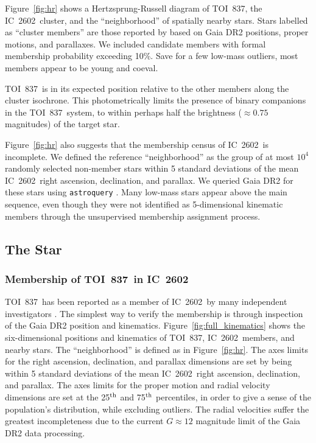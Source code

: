 \documentclass[12pt,twocolumn,tighten]{aastex63}
\newcommand{\tn}{TOI~837} %
\newcommand{\cn}{IC~2602} %
\begin{document}
Figure~\ref{fig:hr} shows a Hertzsprung-Russell diagram of \tn, the
\cn\ cluster, and the ``neighborhood'' of spatially nearby stars.
Stars labelled as ``cluster members'' are those reported by
\citet{cantatgaudin_gaia_2018} based on Gaia DR2 positions, proper
motions, and parallaxes.  We included candidate members with formal
membership probability exceeding 10\%.  Save for a few low-mass
outliers, most members appear to be young and coeval.

\tn\ is in its expected position relative to the other members along
the cluster isochrone.  This photometrically limits the presence of
binary companions in the \tn\ system, to within perhaps half the
brightness ($\approx0.75$ magnitudes) of the target star.

Figure~\ref{fig:hr} also suggests that the membership census of \cn\
is incomplete.  We defined the reference ``neighborhood'' as the group
of at most $10^4$ randomly selected non-member stars within 5 standard
deviations of the mean \cn\ right ascension, declination, and
parallax.  We queried Gaia DR2 for these stars using
\texttt{astroquery} \citep{astroquery_2018}.  Many low-mass stars
appear above the main sequence, even though they were not identified
as 5-dimensional kinematic members through the unsupervised
\citet{cantatgaudin_gaia_2018} membership assignment process.


\subsection{The Star}
\label{subsec:star}

\subsubsection{Membership of \tn\ in \cn}
\label{subsec:member}

\tn\ has been reported as a member of \cn\ by many independent
investigators \citep[{\it
e.g.},][]{Kharchenko_et_al_2013,oh_comoving_2017,cantatgaudin_gaia_2018,damiani_stellar_2019,kounkel_untangling_2019}.
The simplest way to verify the membership is through inspection of the
Gaia DR2 position and kinematics.  Figure~\ref{fig:full_kinematics}
shows the six-dimensional positions and kinematics of \tn, \cn\
members, and nearby stars.  The ``neighborhood'' is defined as in
Figure~\ref{fig:hr}.  The axes limits for the right ascension,
declination, and parallax dimensions are set by being within 5
standard deviations of the mean \cn\ right ascension, declination, and
parallax.  The axes limits for the proper motion and radial velocity
dimensions are set at the 25$^{\rm th}$ and 75$^{\rm th}$ percentiles,
in order to give a sense of the population's distribution, while
excluding outliers.  The radial velocities suffer the greatest
incompleteness due to the current $G\approx12$ magnitude limit of the
Gaia DR2 data processing.
\end{document}
